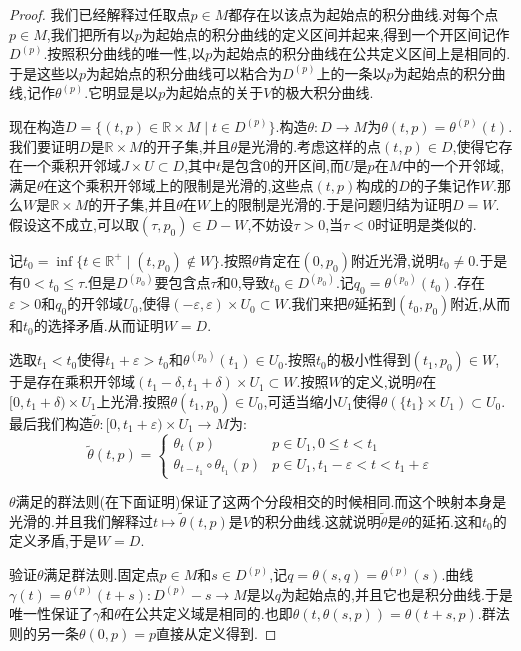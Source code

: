 \begin{enumerate}
\begin{proof}
		我们已经解释过任取点$p\in M$都存在以该点为起始点的积分曲线.对每个点$p\in M$,我们把所有以$p$为起始点的积分曲线的定义区间并起来,得到一个开区间记作$D^{(p)}$.按照积分曲线的唯一性,以$p$为起始点的积分曲线在公共定义区间上是相同的.于是这些以$p$为起始点的积分曲线可以粘合为$D^{(p)}$上的一条以$p$为起始点的积分曲线,记作$\theta^{(p)}$.它明显是以$p$为起始点的关于$V$的极大积分曲线.
		
		现在构造$D=\{(t,p)\in\mathbb{R}\times M\mid t\in D^{(p)}\}$.构造$\theta:D\to M$为$\theta(t,p)=\theta^{(p)}(t)$.我们要证明$D$是$\mathbb{R}\times M$的开子集,并且$\theta$是光滑的.考虑这样的点$(t,p)\in D$,使得它存在一个乘积开邻域$J\times U\subset D$,其中$t$是包含0的开区间,而$U$是$p$在$M$中的一个开邻域,满足$\theta$在这个乘积开邻域上的限制是光滑的,这些点$(t,p)$构成的$D$的子集记作$W$.那么$W$是$\mathbb{R}\times M$的开子集,并且$\theta$在$W$上的限制是光滑的.于是问题归结为证明$D=W$.假设这不成立,可以取$(\tau,p_0)\in D-W$,不妨设$\tau>0$,当$\tau<0$时证明是类似的.
		
		记$t_0=\inf\{t\in\mathbb{R}^+\mid(t,p_0)\not\in W\}$.按照$\theta$肯定在$(0,p_0)$附近光滑,说明$t_0\not=0$.于是有$0<t_0\le\tau$.但是$D^{(p_0)}$要包含点$\tau$和0,导致$t_0\in D^{(p_0)}$.记$q_0=\theta^{(p_0)}(t_0)$.存在$\varepsilon>0$和$q_0$的开邻域$U_0$,使得$(-\varepsilon,\varepsilon)\times U_0\subset W$.我们来把$\theta$延拓到$(t_0,p_0)$附近,从而和$t_0$的选择矛盾.从而证明$W=D$.
		
		选取$t_1<t_0$使得$t_1+\varepsilon>t_0$和$\theta^{(p_0)}(t_1)\in U_0$.按照$t_0$的极小性得到$(t_1,p_0)\in W$,于是存在乘积开邻域$(t_1-\delta,t_1+\delta)\times U_1\subset W$.按照$W$的定义,说明$\theta$在$[0,t_1+\delta)\times U_1$上光滑.按照$\theta(t_1,p_0)\in U_0$,可适当缩小$U_1$使得$\theta(\{t_1\}\times U_1)\subset U_0$.最后我们构造$\widetilde{\theta}:[0,t_1+\varepsilon)\times U_1\to M$为:
		$$\widetilde{\theta}(t,p)=\left\{\begin{array}{cc}\theta_t(p)&p\in U_1,0\le t<t_1\\\theta_{t-t_1}\circ\theta_{t_1}(p)&p\in U_1,t_1-\varepsilon<t<t_1+\varepsilon\end{array}\right.$$
		
		$\theta$满足的群法则(在下面证明)保证了这两个分段相交的时候相同.而这个映射本身是光滑的.并且我们解释过$t\mapsto\widetilde{\theta}(t,p)$是$V$的积分曲线.这就说明$\widetilde{\theta}$是$\theta$的延拓.这和$t_0$的定义矛盾,于是$W=D$.
		
		验证$\theta$满足群法则.固定点$p\in M$和$s\in D^{(p)}$,记$q=\theta(s,q)=\theta^{(p)}(s)$.曲线$\gamma(t)=\theta^{(p)}(t+s):D^{(p)}-s\to M$是以$q$为起始点的,并且它也是积分曲线.于是唯一性保证了$\gamma$和$\theta$在公共定义域是相同的.也即$\theta(t,\theta(s,p))=\theta(t+s,p)$.群法则的另一条$\theta(0,p)=p$直接从定义得到.
		

\end{proof}
\end{enumerate}
